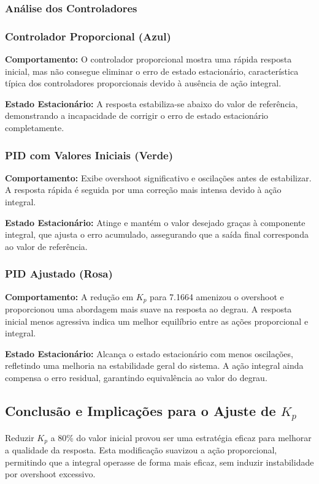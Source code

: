 \subsubsection{Análise dos Controladores}

\subsubsection{Controlador Proporcional (Azul)}
\textbf{Comportamento:} O controlador proporcional mostra uma rápida resposta inicial, mas não consegue eliminar o erro de estado estacionário, característica típica dos controladores proporcionais devido à ausência de ação integral.

\textbf{Estado Estacionário:} A resposta estabiliza-se abaixo do valor de referência, demonstrando a incapacidade de corrigir o erro de estado estacionário completamente.

\subsubsection{PID com Valores Iniciais (Verde)}
\textbf{Comportamento:} Exibe overshoot significativo e oscilações antes de estabilizar. A resposta rápida é seguida por uma correção mais intensa devido à ação integral.

\textbf{Estado Estacionário:} Atinge e mantém o valor desejado graças à componente integral, que ajusta o erro acumulado, assegurando que a saída final corresponda ao valor de referência.

\subsubsection{PID Ajustado (Rosa)}
\textbf{Comportamento:} A redução em \(K_p\) para 7.1664 amenizou o overshoot e proporcionou uma abordagem mais suave na resposta ao degrau. A resposta inicial menos agressiva indica um melhor equilíbrio entre as ações proporcional e integral.

\textbf{Estado Estacionário:} Alcança o estado estacionário com menos oscilações, refletindo uma melhoria na estabilidade geral do sistema. A ação integral ainda compensa o erro residual, garantindo equivalência ao valor do degrau.

\subsection{Conclusão e Implicações para o Ajuste de \(K_p\)}
Reduzir \(K_p\) a 80\% do valor inicial provou ser uma estratégia eficaz para melhorar a qualidade da resposta. Esta modificação suavizou a ação proporcional, permitindo que a integral operasse de forma mais eficaz, sem induzir instabilidade por overshoot excessivo.

